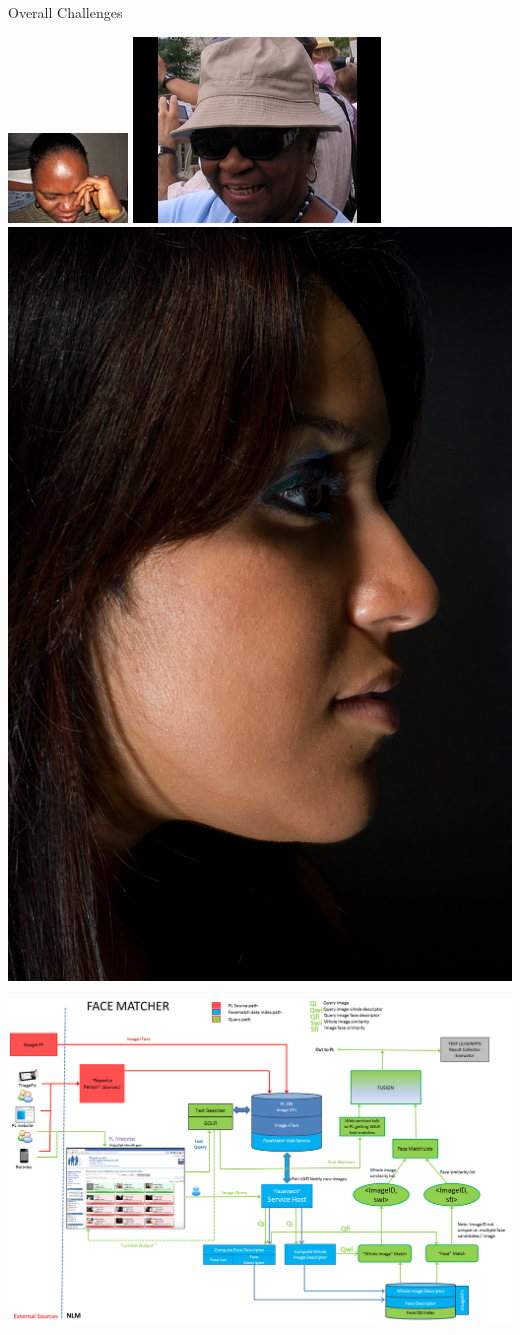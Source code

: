 \begin{xpsectionbox}{Overall Challenges}{}
\begin{minipage}{0.55\linewidth}
\begin{center}
			\includegraphics[height=0.22\linewidth]{images/HEPL_occlusion}
			\includegraphics[height=0.22\linewidth]{images/HEPL_sunglasses_hat}
			\includegraphics[height=0.22\linewidth]{images/AFLW_profile_dark}
\end{center}
\end{minipage}

\end{xpsectionbox}


\begin{xpsectionbox}{}{}

\begin{center}
\includegraphics[height=0.4\linewidth]{images/system_diagram}
\end{center}


\end{xpsectionbox}
